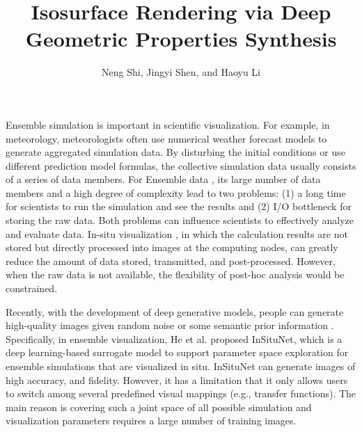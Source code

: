 \documentclass[journal]{vgtc}                %
\title{Isosurface Rendering via Deep Geometric Properties Synthesis}
\author{Neng Shi, Jingyi Shen, and Haoyu Li}
\begin{document}


\maketitle

Ensemble simulation \cite{wang2018visualization} is important in scientific visualization. For example, in meteorology, meteorologists often use numerical weather forecast models to generate aggregated simulation data. By disturbing the initial conditions or use different prediction model formulas, the collective simulation data usually consists of a series of data members. For Ensemble data \cite{ahrens2014situ, ahrens2014image}, its large number of data members and a high degree of complexity lead to two problems: (1) a long time for scientists to run the simulation and see the results and (2) I/O bottleneck for storing the raw data. Both problems can influence scientists to effectively analyze and evaluate data. In-situ visualization \cite{bauer2016situ, ma2009situ}, in which the calculation results are not stored but directly processed into images at the computing nodes, can greatly reduce the amount of data stored, transmitted, and post-processed. However, when the raw data is not available, the flexibility of post-hoc analysis would be constrained.  

Recently, with the development of deep generative models, people can generate high-quality images given random noise \cite{goodfellow2014generative} or some semantic prior information \cite{mirza2014conditional}. Specifically, in ensemble visualization, He et al. \cite{he2019insitunet} proposed InSituNet, which is a deep learning-based surrogate model to support parameter space exploration for ensemble simulations that are visualized in situ. InSituNet can generate images of high accuracy, and fidelity. However, it has a limitation that it only allows users to switch among several predefined visual mappings (e.g., transfer functions). The main reason is covering such a joint space of all possible simulation and visualization parameters requires a large number of training images.
\end{document}

